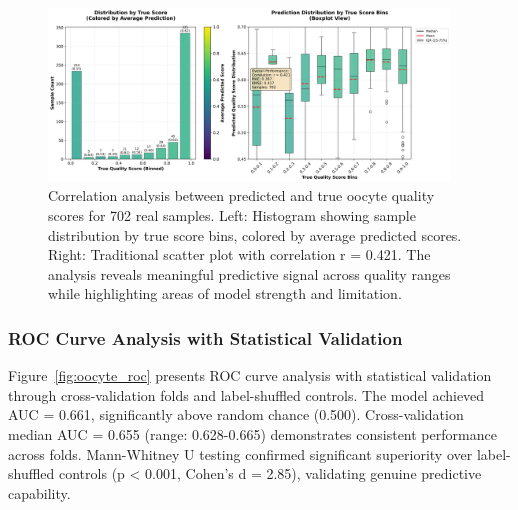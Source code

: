\begin{figure}[H]
    \centering
    \includegraphics[width=0.95\textwidth]{figures/oocyte_correlation.png}
    \caption{Correlation analysis between predicted and true oocyte quality scores for 702 real samples. Left: Histogram showing sample distribution by true score bins, colored by average predicted scores. Right: Traditional scatter plot with correlation r = 0.421. The analysis reveals meaningful predictive signal across quality ranges while highlighting areas of model strength and limitation.}
    \label{fig:oocyte_correlation}
\end{figure}

\subsubsection{ROC Curve Analysis with Statistical Validation}

Figure~\ref{fig:oocyte_roc} presents ROC curve analysis with statistical validation through cross-validation folds and label-shuffled controls. The model achieved AUC = 0.661, significantly above random chance (0.500). Cross-validation median AUC = 0.655 (range: 0.628-0.665) demonstrates consistent performance across folds. Mann-Whitney U testing confirmed significant superiority over label-shuffled controls (p < 0.001, Cohen's d = 2.85), validating genuine predictive capability.

